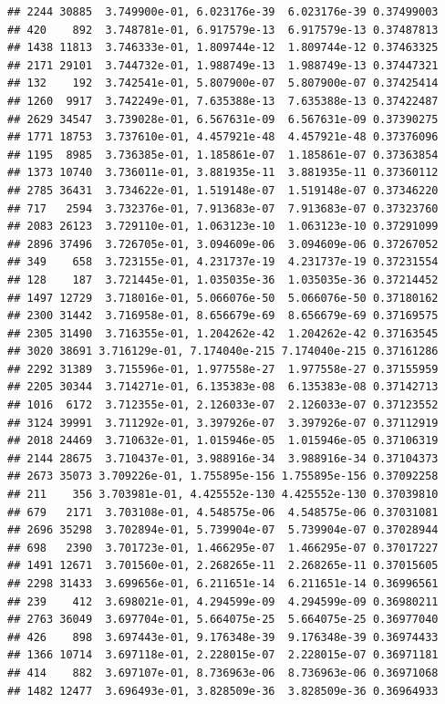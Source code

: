 \documentclass[
]{article}
\begin{document}
\begin{verbatim}
## 2244 30885  3.749900e-01, 6.023176e-39  6.023176e-39 0.37499003
## 420    892  3.748781e-01, 6.917579e-13  6.917579e-13 0.37487813
## 1438 11813  3.746333e-01, 1.809744e-12  1.809744e-12 0.37463325
## 2171 29101  3.744732e-01, 1.988749e-13  1.988749e-13 0.37447321
## 132    192  3.742541e-01, 5.807900e-07  5.807900e-07 0.37425414
## 1260  9917  3.742249e-01, 7.635388e-13  7.635388e-13 0.37422487
## 2629 34547  3.739028e-01, 6.567631e-09  6.567631e-09 0.37390275
## 1771 18753  3.737610e-01, 4.457921e-48  4.457921e-48 0.37376096
## 1195  8985  3.736385e-01, 1.185861e-07  1.185861e-07 0.37363854
## 1373 10740  3.736011e-01, 3.881935e-11  3.881935e-11 0.37360112
## 2785 36431  3.734622e-01, 1.519148e-07  1.519148e-07 0.37346220
## 717   2594  3.732376e-01, 7.913683e-07  7.913683e-07 0.37323760
## 2083 26123  3.729110e-01, 1.063123e-10  1.063123e-10 0.37291099
## 2896 37496  3.726705e-01, 3.094609e-06  3.094609e-06 0.37267052
## 349    658  3.723155e-01, 4.231737e-19  4.231737e-19 0.37231554
## 128    187  3.721445e-01, 1.035035e-36  1.035035e-36 0.37214452
## 1497 12729  3.718016e-01, 5.066076e-50  5.066076e-50 0.37180162
## 2300 31442  3.716958e-01, 8.656679e-69  8.656679e-69 0.37169575
## 2305 31490  3.716355e-01, 1.204262e-42  1.204262e-42 0.37163545
## 3020 38691 3.716129e-01, 7.174040e-215 7.174040e-215 0.37161286
## 2292 31389  3.715596e-01, 1.977558e-27  1.977558e-27 0.37155959
## 2205 30344  3.714271e-01, 6.135383e-08  6.135383e-08 0.37142713
## 1016  6172  3.712355e-01, 2.126033e-07  2.126033e-07 0.37123552
## 3124 39991  3.711292e-01, 3.397926e-07  3.397926e-07 0.37112919
## 2018 24469  3.710632e-01, 1.015946e-05  1.015946e-05 0.37106319
## 2144 28675  3.710437e-01, 3.988916e-34  3.988916e-34 0.37104373
## 2673 35073 3.709226e-01, 1.755895e-156 1.755895e-156 0.37092258
## 211    356 3.703981e-01, 4.425552e-130 4.425552e-130 0.37039810
## 679   2171  3.703108e-01, 4.548575e-06  4.548575e-06 0.37031081
## 2696 35298  3.702894e-01, 5.739904e-07  5.739904e-07 0.37028944
## 698   2390  3.701723e-01, 1.466295e-07  1.466295e-07 0.37017227
## 1491 12671  3.701560e-01, 2.268265e-11  2.268265e-11 0.37015605
## 2298 31433  3.699656e-01, 6.211651e-14  6.211651e-14 0.36996561
## 239    412  3.698021e-01, 4.294599e-09  4.294599e-09 0.36980211
## 2763 36049  3.697704e-01, 5.664075e-25  5.664075e-25 0.36977040
## 426    898  3.697443e-01, 9.176348e-39  9.176348e-39 0.36974433
## 1366 10714  3.697118e-01, 2.228015e-07  2.228015e-07 0.36971181
## 414    882  3.697107e-01, 8.736963e-06  8.736963e-06 0.36971068
## 1482 12477  3.696493e-01, 3.828509e-36  3.828509e-36 0.36964933

\end{verbatim}
\end{document}
